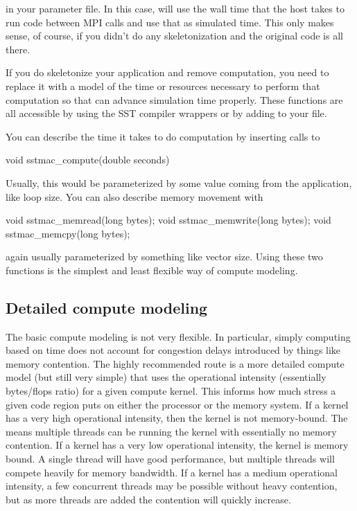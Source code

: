 in your parameter file.  In this case, \sstmacro will use the wall time that the host takes to run code between MPI calls and use that as simulated time.  This only makes sense, of course, if you didn't do any skeletonization and the original code is all there. 

If you do skeletonize your application and remove computation, you need to replace it with a model of the time or resources necessary to perform that computation so that \sstmacro can advance simulation time properly. 
These functions are all accessible by using the SST compiler wrappers or by adding  to your file.

You can describe the time it takes to do computation by inserting calls to 

\begin{ViFile}
void sstmac_compute(double seconds)
\end{ViFile}
Usually, this would be parameterized by some value coming from the application, like loop size.   You can also describe memory movement with 

\begin{ViFile}
void sstmac_memread(long bytes);
void sstmac_memwrite(long bytes);
void sstmac_memcpy(long bytes);
\end{ViFile}
again usually parameterized by something like vector size.  
Using these two functions is the simplest and least flexible way of compute modeling.

\subsection{Detailed compute modeling}
The basic compute modeling is not very flexible.  
In particular, simply computing based on time does not account for congestion delays introduced by things like memory contention.
The highly recommended route is a more detailed compute model (but still very simple) that uses the operational intensity (essentially bytes/flops ratio) for a given compute kernel.
This informs \sstmacro how much stress a given code region puts on either the processor or the memory system.
If a kernel has a very high operational intensity, then the kernel is not memory-bound.
The means multiple threads can be running the kernel with essentially no memory contention.
If a kernel has a very low operational intensity, the kernel is memory bound.
A single thread will have good performance, but multiple threads will compete heavily for memory bandwidth.
If a kernel has a medium operational intensity, a few concurrent threads may be possible without heavy contention, 
but as more threads are added the contention will quickly increase.

